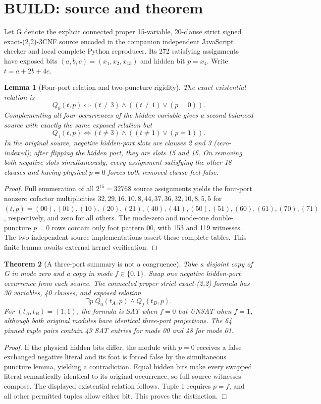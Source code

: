 \documentclass[11pt]{article}
\newtheorem{theorem}{Theorem}
\newtheorem{lemma}[theorem]{Lemma}
\begin{document}
\section{BUILD: source and theorem}
Let G denote the explicit connected proper 15-variable, 20-clause strict signed exact-(2,2)-3CNF source encoded in the companion independent JavaScript checker and local complete Python reproducer. Its 272 satisfying assignments have exposed bits $(a,b,c)=(x_1,x_2,x_{13})$ and hidden bit $p=x_4$. Write $t=a+2b+4c$.
\begin{lemma}[Four-port relation and two-puncture rigidity]
The exact existential relation is
\[
Q_0(t,p)\iff(t\ne3)\land((t\ne1)\lor(p=0)).
\]
Complementing all four occurrences of the hidden variable gives a second balanced source with exactly the same exposed relation but
\[
Q_1(t,p)\iff(t\ne3)\land((t\ne1)\lor(p=1)).
\]
In the original source, negative hidden-port slots are clauses 2 and 3 (zero-indexed); after flipping the hidden port, they are slots 15 and 16. On removing both negative slots simultaneously, every assignment satisfying the other 18 clauses and having physical $p=0$ forces \emph{both} removed clause feet false.
\end{lemma}
\begin{proof}
Full enumeration of all $2^{15}=32768$ source assignments yields the four-port nonzero cofactor multiplicities $32,29,16,10,8,44,37,36,32,10,8,5,5$ for $(t,p)=(00),(01),(10),(20),(21),(40),(41),(50),(51),(60),(61),(70),(71)$, respectively, and zero for all others. The mode-zero and mode-one double-puncture $p=0$ rows contain only foot pattern $00$, with 153 and 119 witnesses. The two independent source implementations assert these complete tables. This finite lemma awaits external kernel verification.
\end{proof}
\begin{theorem}[A three-port summary is not a congruence]
Take a disjoint copy of G in mode zero and a copy in mode $f\in\{0,1\}$. Swap one negative hidden-port occurrence from each source. The connected proper strict exact-(2,2) formula has 30 variables, 40 clauses, and exposed relation
\[
\exists p\;Q_0(t_A,p)\land Q_f(t_B,p).
\]
For $(t_A,t_B)=(1,1)$, the formula is SAT when $f=0$ but UNSAT when $f=1$, although both original modules have identical three-port projections. The 64 pinned tuple pairs contain 49 SAT entries for mode 00 and 48 for mode 01.
\end{theorem}
\begin{proof}
If the physical hidden bits differ, the module with $p=0$ receives a false exchanged negative literal and its foot is forced false by the simultaneous puncture lemma, yielding a contradiction. Equal hidden bits make every swapped literal semantically identical to its original occurrence, so full source witnesses compose. The displayed existential relation follows. Tuple 1 requires $p=f$, and all other permitted tuples allow either bit. This proves the distinction.
\end{proof}
\end{document}
